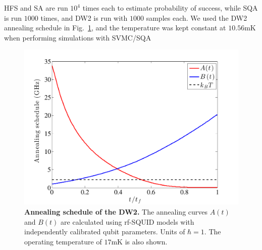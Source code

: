 HFS and SA are run $10^4$ times each to estimate probability of success, while SQA is run $1000$ times, and DW2 is run with $1000$ samples each. We used the DW2 annealing schedule in Fig.~\ref{fig:schedule_planted}, and the temperature was kept constant at $10.56$mK when performing simulations with SVMC/SQA
%
\begin{figure}[t]
\begin{center}
\includegraphics[width=\columnwidth]{chapters/Planted/AnnealingSchedule}
\caption{\textbf{Annealing schedule of the DW2.}  The annealing curves $A(t)$ and $B(t)$ are calculated using rf-SQUID models with independently calibrated qubit parameters. Units of $\hbar = 1$.  The operating temperature of $17$mK is also shown.}
\label{fig:schedule_planted}
\end{center}
\end{figure}
%
